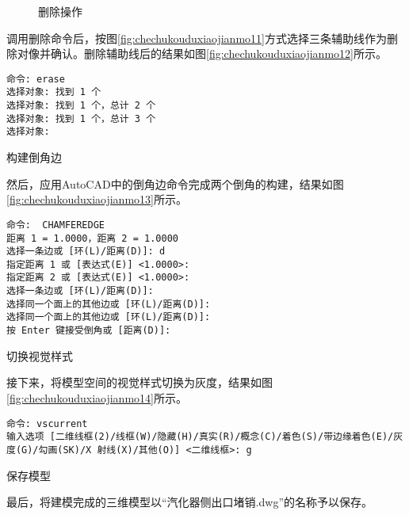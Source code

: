 \begin{procedure}
\begin{figure}[htbp]%
\centering
{}\hspace{20pt}
\caption{删除操作}
\end{figure}

调用删除命令后，按图\ref{fig:chechukouduxiaojianmo11}方式选择三条辅助线作为删除对像并确认。删除辅助线后的结果如图\ref{fig:chechukouduxiaojianmo12}所示。

\begin{lstlisting}
命令: erase
选择对象: 找到 1 个
选择对象: 找到 1 个，总计 2 个
选择对象: 找到 1 个，总计 3 个
选择对象:
\end{lstlisting}

\item 构建倒角边

然后，应用AutoCAD中的倒角边命令完成两个倒角的构建，结果如图\ref{fig:chechukouduxiaojianmo13}所示。

\begin{lstlisting}
命令:  CHAMFEREDGE
距离 1 = 1.0000，距离 2 = 1.0000
选择一条边或 [环(L)/距离(D)]: d
指定距离 1 或 [表达式(E)] <1.0000>:
指定距离 2 或 [表达式(E)] <1.0000>:
选择一条边或 [环(L)/距离(D)]:
选择同一个面上的其他边或 [环(L)/距离(D)]:
选择同一个面上的其他边或 [环(L)/距离(D)]:
按 Enter 键接受倒角或 [距离(D)]:
\end{lstlisting}

\begin{figure}[htbp]%
\centering
\begin{floatrow}[2]
\end{floatrow}
\end{figure}

\item 切换视觉样式

接下来，将模型空间的视觉样式切换为灰度，结果如图\ref{fig:chechukouduxiaojianmo14}所示。
\begin{lstlisting}
命令: vscurrent
输入选项 [二维线框(2)/线框(W)/隐藏(H)/真实(R)/概念(C)/着色(S)/带边缘着色(E)/灰度(G)/勾画(SK)/X 射线(X)/其他(O)] <二维线框>: g
\end{lstlisting}

\item 保存模型

最后，将建模完成的三维模型以“汽化器侧出口堵销.dwg”的名称予以保存。
\end{procedure}
\endinput